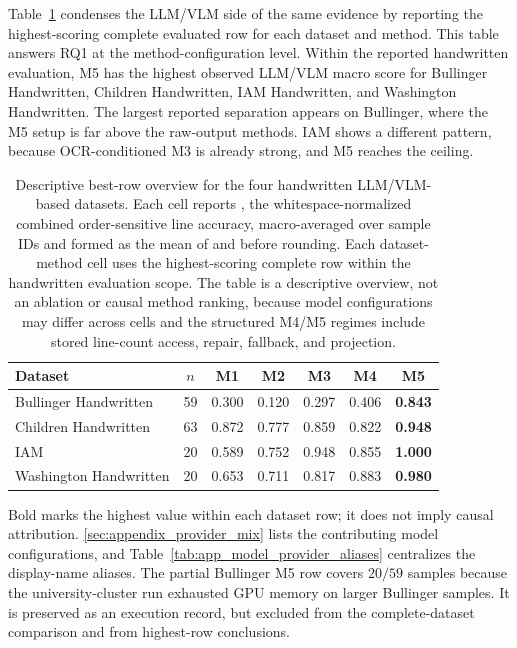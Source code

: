 Table~\ref{tab:exp_handwritten_main_overview} condenses the LLM/VLM side of the same evidence by reporting the highest-scoring complete evaluated row for each dataset and method. This table answers RQ1 at the method-configuration level. Within the reported handwritten evaluation, M5 has the highest observed LLM/VLM macro score for Bullinger Handwritten, Children Handwritten, IAM Handwritten, and Washington Handwritten. The largest reported separation appears on Bullinger, where the M5 setup is far above the raw-output methods. IAM shows a different pattern, because OCR-conditioned M3 is already strong, and M5 reaches the ceiling.

\begin{table}[H]
  \centering
  \caption{Descriptive best-row overview for the four handwritten LLM/VLM-based datasets. Each cell reports \LANormCombined{}, the whitespace-normalized combined order-sensitive line accuracy, macro-averaged over sample IDs and formed as the mean of \LANormForward{} and \LANormReverse{} before rounding. Each dataset-method cell uses the highest-scoring complete row within the handwritten evaluation scope. The table is a descriptive overview, not an ablation or causal method ranking, because model configurations may differ across cells and the structured M4/M5 regimes include stored line-count access, repair, fallback, and projection.}
  \label{tab:exp_handwritten_main_overview}
  \footnotesize
  \setlength{\tabcolsep}{4pt}
  \renewcommand{\arraystretch}{1.08}
  \begin{tabular}{@{}l c c c c c c@{}}
    \toprule
    \textbf{Dataset} & \textbf{\(n\)} & \textbf{M1} & \textbf{M2} & \textbf{M3} & \textbf{M4} & \textbf{M5} \\
    \midrule
    Bullinger Handwritten & 59 & 0.300 & 0.120 & 0.297 & 0.406 & \textbf{0.843} \\
    Children Handwritten & 63 & 0.872 & 0.777 & 0.859 & 0.822 & \textbf{0.948} \\
    IAM & 20 & 0.589 & 0.752 & 0.948 & 0.855 & \textbf{1.000} \\
    Washington Handwritten & 20 & 0.653 & 0.711 & 0.817 & 0.883 & \textbf{0.980} \\
    \bottomrule
  \end{tabular}
  \vspace{0.35em}

  \parbox{0.82\linewidth}{\footnotesize Bold marks the highest value within each dataset row; it does not imply causal attribution. \autoref{sec:appendix_provider_mix} lists the contributing model configurations, and Table~\ref{tab:app_model_provider_aliases} centralizes the display-name aliases. The partial Bullinger \QwenThirtyTwoShort{} M5 row covers \(20/59\) samples because the university-cluster run exhausted GPU memory on larger Bullinger samples. It is preserved as an execution record, but excluded from the complete-dataset comparison and from highest-row conclusions.}
\end{table}

